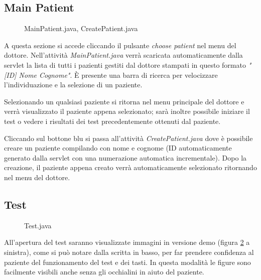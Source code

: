 \documentclass[
	corpo=12pt,
	twoside,
 	evenboxes,
	tipotesi=triennale,
    	stile=classica,
   	 greek,
]{toptesi}
\begin{document}
\subsection{Main Patient}
\label{subsec:main patient}
\begin{figure}[H]
\centering
{}
\caption{MainPatient.java, CreatePatient.java}
\label{fig:app_choose_create_patient}
\end{figure}
A questa sezione si accede cliccando il pulsante \textit{choose patient} nel menu del dottore. Nell'attività \textit{MainPatient.java} verrà scaricata automaticamente dalla servlet la lista di tutti i pazienti gestiti dal dottore stampati in questo formato \textit{"[ID] Nome Cognome"}. È presente una barra di ricerca per velocizzare l'individuazione e la selezione di un paziente. 

Selezionando un qualsiasi paziente si ritorna nel menu principale del dottore e verrà visualizzato il paziente appena selezionato; sarà inoltre possibile iniziare il test o vedere i risultati dei test precedentemente ottenuti dal paziente.

Cliccando sul bottone blu si passa all'attività \textit{CreatePatient.java} dove è possibile creare un paziente compilando con nome e cognome (ID automaticamente generato dalla servlet con una numerazione automatica incrementale). Dopo la creazione, il paziente appena creato verrà automaticamente selezionato ritornando nel menu del dottore.

\vfill

\subsection{Test}
\label{subsec:test}
\begin{figure}[H]
\centering
{}
\caption{Test.java}
\label{fig:app_test}
\end{figure}
All'apertura del test saranno visualizzate immagini in versione demo (figura \ref{fig:app_test} a sinistra), come si può notare dalla scritta in basso, per far prendere confidenza al paziente del funzionamento del test e dei tasti. In questa modalità le figure sono facilmente visibili anche senza gli occhialini in aiuto del paziente.
\end{document}
